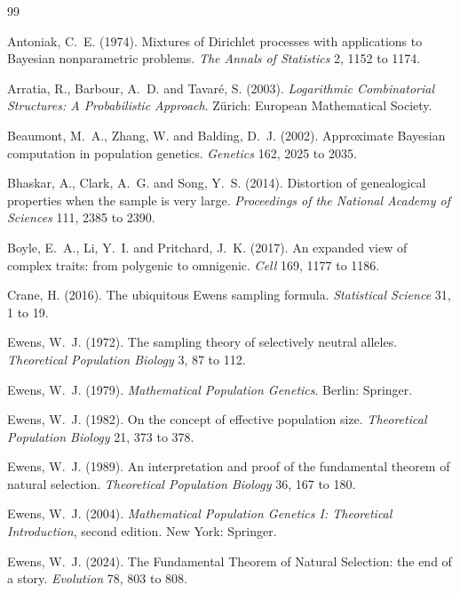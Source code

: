 \begin{thebibliography}{99}

Antoniak, C.~E. (1974). Mixtures of Dirichlet processes with applications to Bayesian
nonparametric problems. \emph{The Annals of Statistics} 2, 1152 to 1174.

Arratia, R., Barbour, A.~D. and Tavar\'e, S. (2003). \emph{Logarithmic Combinatorial Structures:
A Probabilistic Approach}. Z\"urich: European Mathematical Society.

Beaumont, M.~A., Zhang, W. and Balding, D.~J. (2002). Approximate Bayesian computation in
population genetics. \emph{Genetics} 162, 2025 to 2035.

Bhaskar, A., Clark, A.~G. and Song, Y.~S. (2014). Distortion of genealogical properties when the
sample is very large. \emph{Proceedings of the National Academy of Sciences} 111, 2385 to 2390.

Boyle, E.~A., Li, Y.~I. and Pritchard, J.~K. (2017). An expanded view of complex traits: from
polygenic to omnigenic. \emph{Cell} 169, 1177 to 1186.

Crane, H. (2016). The ubiquitous Ewens sampling formula. \emph{Statistical Science} 31, 1 to 19.

Ewens, W.~J. (1972). The sampling theory of selectively neutral alleles. \emph{Theoretical
Population Biology} 3, 87 to 112.

Ewens, W.~J. (1979). \emph{Mathematical Population Genetics}. Berlin: Springer.

Ewens, W.~J. (1982). On the concept of effective population size. \emph{Theoretical
Population Biology} 21, 373 to 378.

Ewens, W.~J. (1989). An interpretation and proof of the fundamental theorem of natural selection.
\emph{Theoretical Population Biology} 36, 167 to 180.

Ewens, W.~J. (2004). \emph{Mathematical Population Genetics I: Theoretical Introduction}, second
edition. New York: Springer.

Ewens, W.~J. (2024). The Fundamental Theorem of Natural Selection: the end of a story. \emph{Evolution} 78, 803 to 808.


\end{thebibliography}

